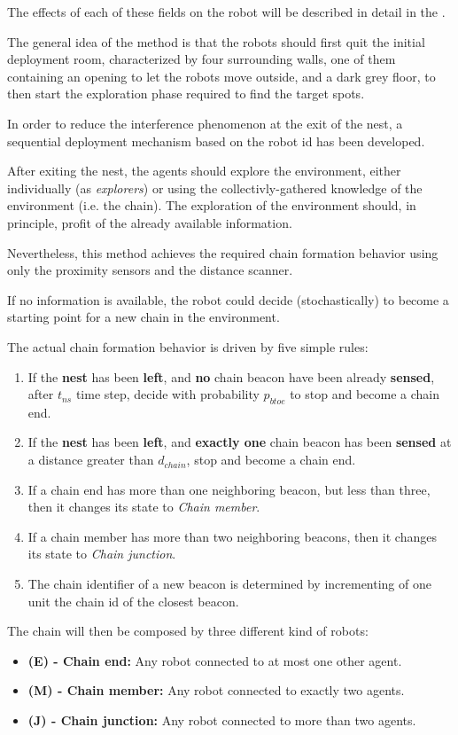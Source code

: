 The effects of each of these fields on the robot will be described in detail in the .

The general idea of the method is that the robots should first quit the initial deployment room, characterized by four surrounding walls, one of them containing an opening to let the robots move outside, and a dark grey floor, to then start the exploration phase required to find the target spots.

In order to reduce the interference phenomenon at the exit of the nest, a sequential deployment mechanism based on the robot id has been developed.

After exiting the nest, the agents should explore the environment, either individually (as \emph{explorers}) or using the collectivly-gathered knowledge of the environment (i.e. the chain).
The exploration of the environment should, in principle, profit of the already available information.

Nevertheless, this method achieves the required chain formation behavior using only the proximity sensors and the distance scanner.

If no information is available, the robot could decide (stochastically) to become a starting point for a new chain in the environment. 

The actual chain formation behavior is driven by five simple rules:
\begin{enumerate}
  \item If the \textbf{nest} has been \textbf{left}, and \textbf{no} chain beacon have been already \textbf{sensed}, after $t_{ns}$ time step, decide with probability $p_{btoe}$ to stop and become a chain end.
  \item If the \textbf{nest} has been \textbf{left}, and \textbf{exactly one} chain beacon has been \textbf{sensed} at a distance greater than $d_{chain}$, stop and become a chain end.
  \item If a chain end has more than one neighboring beacon, but less than three, then it changes its state to \emph{Chain member}.
  \item If a chain member has more than two neighboring beacons, then it changes its state to \emph{Chain junction}.
  \item The chain identifier of a new beacon is determined by incrementing of one unit the chain id of the closest beacon.
\end{enumerate}

The chain will then be composed by three different kind of robots:
\begin{itemize}
  \item \textbf{(E) - Chain end:} Any robot connected to at most one other agent.
  \item \textbf{(M) - Chain member:} Any robot connected to exactly two agents.
  \item \textbf{(J) - Chain junction:} Any robot connected to more than two agents.
\end{itemize}

